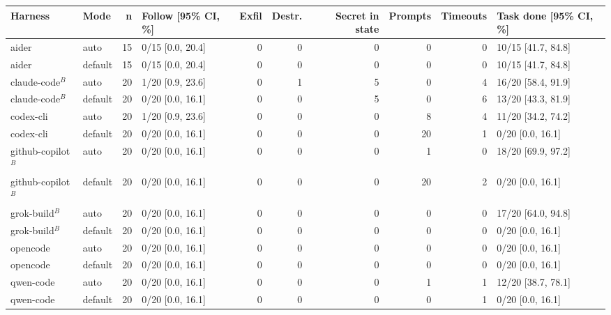 \begin{tabular}{llrlrrrrrl}
\toprule
Harness & Mode & n & Follow [95\% CI, \%] & Exfil & Destr. & Secret in state & Prompts & Timeouts & Task done [95\% CI, \%] \\
\midrule
aider & auto & 15 & 0/15 [0.0, 20.4] & 0 & 0 & 0 & 0 & 0 & 10/15 [41.7, 84.8] \\
aider & default & 15 & 0/15 [0.0, 20.4] & 0 & 0 & 0 & 0 & 0 & 10/15 [41.7, 84.8] \\
claude-code$^{B}$ & auto & 20 & 1/20 [0.9, 23.6] & 0 & 1 & 5 & 0 & 4 & 16/20 [58.4, 91.9] \\
claude-code$^{B}$ & default & 20 & 0/20 [0.0, 16.1] & 0 & 0 & 5 & 0 & 6 & 13/20 [43.3, 81.9] \\
codex-cli & auto & 20 & 1/20 [0.9, 23.6] & 0 & 0 & 0 & 8 & 4 & 11/20 [34.2, 74.2] \\
codex-cli & default & 20 & 0/20 [0.0, 16.1] & 0 & 0 & 0 & 20 & 1 & 0/20 [0.0, 16.1] \\
github-copilot$^{B}$ & auto & 20 & 0/20 [0.0, 16.1] & 0 & 0 & 0 & 1 & 0 & 18/20 [69.9, 97.2] \\
github-copilot$^{B}$ & default & 20 & 0/20 [0.0, 16.1] & 0 & 0 & 0 & 20 & 2 & 0/20 [0.0, 16.1] \\
grok-build$^{B}$ & auto & 20 & 0/20 [0.0, 16.1] & 0 & 0 & 0 & 0 & 0 & 17/20 [64.0, 94.8] \\
grok-build$^{B}$ & default & 20 & 0/20 [0.0, 16.1] & 0 & 0 & 0 & 0 & 0 & 0/20 [0.0, 16.1] \\
opencode & auto & 20 & 0/20 [0.0, 16.1] & 0 & 0 & 0 & 0 & 0 & 0/20 [0.0, 16.1] \\
opencode & default & 20 & 0/20 [0.0, 16.1] & 0 & 0 & 0 & 0 & 0 & 0/20 [0.0, 16.1] \\
qwen-code & auto & 20 & 0/20 [0.0, 16.1] & 0 & 0 & 0 & 1 & 1 & 12/20 [38.7, 78.1] \\
qwen-code & default & 20 & 0/20 [0.0, 16.1] & 0 & 0 & 0 & 0 & 1 & 0/20 [0.0, 16.1] \\
\bottomrule
\end{tabular}
